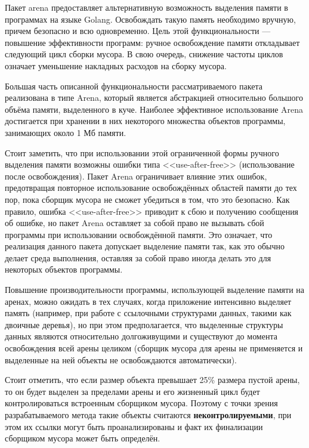 Пакет arena предоставляет альтернативную возможность выделения памяти в программах на языке Golang. Освобождать такую память необходимо вручную, причем безопасно и всю одновременно. Цель этой функциональности --- повышение эффективности программ: ручное освобождение памяти откладывает следующий цикл сборки мусора. В свою очередь, снижение частоты циклов означает уменьшение накладных расходов на сборку мусора. \cite{golang_arena_cource}

Большая часть описанной функциональности рассматриваемого пакета реализована в типе Arena, который является абстракцией относительно большого объёма памяти, выделенного в куче. Наиболее эффективное использование Arena достигается при хранении в них некоторого множества объектов программы, занимающих около 1 Мб памяти. \cite{golang_arena_cource} \cite{golang_arena_proposal}

Стоит заметить, что при использовании этой ограниченной формы ручного выделения памяти возможны ошибки типа <<use-after-free>> (использование после освобождения). Пакет Arena ограничивает влияние этих ошибок, предотвращая повторное использование освобождённых областей памяти до тех пор, пока сборщик мусора не сможет убедиться в том, что это безопасно. Как правило, ошибка <<use-after-free>> приводит к сбою и получению сообщения об ошибке, но пакет Arena оставляет за собой право не вызывать сбой программы при использовании освобождённой памяти. Это означает, что реализация данного пакета допускает выделение памяти так, как это обычно делает среда выполнения, оставляя за собой право иногда делать это для некоторых объектов программы.~\cite{golang_arena_cource}

Повышение производительности программы, использующей выделение памяти на аренах, можно ожидать в тех случаях, когда приложение интенсивно выделяет память (например, при работе с ссылочными структурами данных, такими как двоичные деревья), но при этом предполагается, что выделенные структуры данных являются относительно долгоживущими и существуют до момента освобождения всей арены целиком (сборщик мусора для арены не применяется и выделенные на ней объекты не освобождаются автоматически).

Стоит отметить, что если размер объекта превышает 25\% размера пустой арены, то он будет выделен за пределами арены и его жизненный цикл будет контролироваться встроенным сборщиком мусора. Поэтому с точки зрения разрабатываемого метода такие объекты считаются \textbf{неконтролируемыми}, при этом их ссылки могут быть проанализированы и факт их финализации сборщиком мусора может быть определён.

